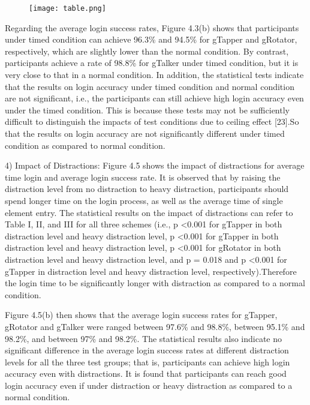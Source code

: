 \documentclass[12pt,a4paper,oneside]{report}
\begin{document}
\begin{figure}[H]
    \begin{center}
        \label{abc}
            \texttt{[image: table.png]}
    \end{center}
\end{figure}

\par Regarding the average login success rates, Figure 4.3(b)
shows that participants under timed condition can achieve
96.3\% and 94.5\% for gTapper and gRotator, respectively,
which are slightly lower than the normal condition. By contrast, participants achieve a rate of 98.8\% for gTalker under
timed condition, but it is very close to that in a normal
condition. In addition, the statistical tests indicate that the
results on login accuracy under timed condition and normal
condition are not significant, i.e., the participants can still
achieve high login accuracy even under the timed condition.
This is because these tests may not be sufficiently difficult
to distinguish the impacts of test conditions due to ceiling
effect [23].So  that the results on login
accuracy are not significantly different under timed condition
as compared to normal condition.
\par
4) Impact of Distractions: Figure 4.5 shows the impact of
distractions for average time login and average login success
rate. It is observed that by raising the distraction level from
no distraction to heavy distraction, participants should spend
longer time on the login process, as well as the average time
of single element entry. The statistical results on the impact
of distractions can refer to Table I, II, and III for all three
schemes (i.e., p \textless 0.001 for gTapper in both distraction level
and heavy distraction level, p \textless 0.001 for gTapper in both
distraction level and heavy distraction level, p \textless 0.001 for
gRotator in both distraction level and heavy distraction level,
and p = 0.018 and p \textless 0.001 for gTapper in distraction level
and heavy distraction level, respectively).Therefore the login time to be significantly longer with
distraction as compared to a normal condition.
\par 
Figure 4.5(b) then shows that the average login success rates
for gTapper, gRotator and gTalker were ranged between 97.6\%
and 98.8\%, between 95.1\% and 98.2\%, and between 97\% and
98.2\%. The statistical results also indicate no significant difference in the average login success rates at different distraction
levels for all the three test groups; that is, participants can
achieve high login accuracy even with distractions. It is found that participants can reach good login
accuracy even if under distraction or heavy distraction as
compared to a normal condition.
\end{document}
